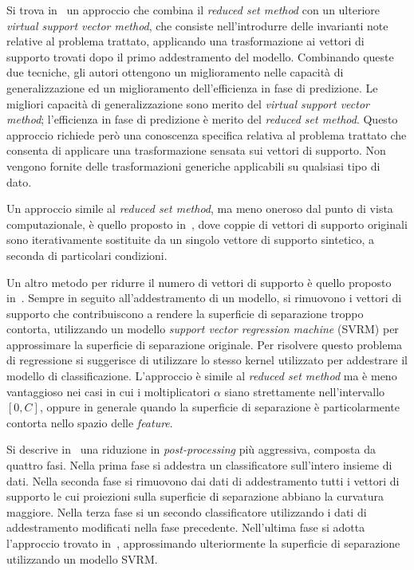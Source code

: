 Si trova in~\cite{burges_improving_accuracy} un approccio che combina il \emph{reduced set method} con un ulteriore \emph{virtual support vector method}, che consiste nell'introdurre delle invarianti note relative al problema trattato, applicando una trasformazione ai vettori di supporto trovati dopo il primo addestramento del modello. 
Combinando queste due tecniche, gli autori ottengono un miglioramento nelle capacità di generalizzazione ed un miglioramento dell'efficienza in fase di predizione. Le migliori capacità di generalizzazione sono merito del \emph{virtual support vector method}; l'efficienza in fase di predizione è merito del \emph{reduced set method}.
Questo approccio richiede però una conoscenza specifica relativa al problema trattato che consenta di applicare una trasformazione sensata sui vettori di supporto. Non vengono fornite delle trasformazioni generiche applicabili su qualsiasi tipo di dato. 

Un approccio simile al \emph{reduced set method}, ma meno oneroso dal punto di vista computazionale, è quello proposto in~\cite{2005_merging_strategy}, dove coppie di vettori di supporto originali sono iterativamente sostituite da un singolo vettore di supporto sintetico, a seconda di particolari condizioni. 

Un altro metodo per ridurre il numero di vettori di supporto è quello proposto in~\cite{1998_reducing_svm_complexity}. 
Sempre in seguito all'addestramento di un modello, si rimuovono i vettori di supporto che contribuiscono a rendere la superficie di separazione troppo contorta, utilizzando un modello \emph{support vector regression machine} (SVRM) per approssimare la superficie di separazione originale.
Per risolvere questo problema di regressione si suggerisce di utilizzare lo stesso kernel utilizzato per addestrare il modello di classificazione.
L'approccio è simile al \emph{reduced set method} ma è meno vantaggioso nei casi in cui i moltiplicatori $\alpha$ siano strettamente nell'intervallo $[0,C]$, oppure in generale quando la superficie di separazione è particolarmente contorta nello spazio delle \emph{feature}.

Si descrive in~\cite{2005_multistage_postprocessing} una riduzione in \emph{post-processing} più aggressiva, composta da quattro fasi. 
Nella prima fase si addestra un classificatore sull'intero insieme di dati. 
Nella seconda fase si rimuovono dai dati di addestramento tutti i vettori di supporto le cui proiezioni sulla superficie di separazione abbiano la curvatura maggiore. 
Nella terza fase si un secondo classificatore utilizzando i dati di addestramento modificati nella fase precedente. 
Nell'ultima fase si adotta l'approccio trovato in~\cite{1998_reducing_svm_complexity}, approssimando ulteriormente la superficie di separazione utilizzando un modello SVRM.

